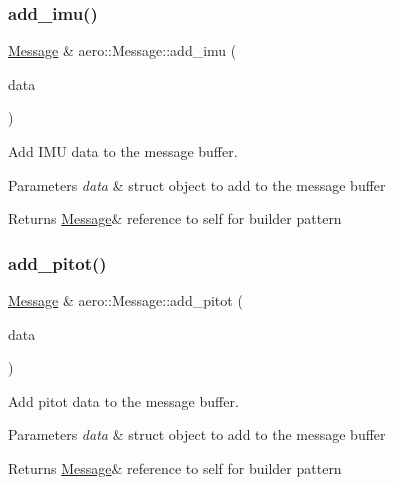 \subsubsection{\texorpdfstring{add\+\_\+imu()}{add\_imu()}}
{\footnotesize\ttfamily \hyperlink{classaero_1_1Message}{Message} \& aero\+::\+Message\+::add\+\_\+imu (\begin{DoxyParamCaption}\item[{const I\+MU \&}]{data }\end{DoxyParamCaption})}



Add I\+MU data to the message buffer. 


\begin{DoxyParams}{Parameters}
{\em data} & struct object to add to the message buffer \\
\hline
\end{DoxyParams}
\begin{DoxyReturn}{Returns}
\hyperlink{classaero_1_1Message}{Message}\& reference to self for builder pattern 
\end{DoxyReturn}
\mbox{\label{classaero_1_1Message_a7b6213ffe715f032ff1301ae8192a338}} 
\subsubsection{\texorpdfstring{add\+\_\+pitot()}{add\_pitot()}}
{\footnotesize\ttfamily \hyperlink{classaero_1_1Message}{Message} \& aero\+::\+Message\+::add\+\_\+pitot (\begin{DoxyParamCaption}\item[{const Pitot \&}]{data }\end{DoxyParamCaption})}



Add pitot data to the message buffer. 


\begin{DoxyParams}{Parameters}
{\em data} & struct object to add to the message buffer \\
\hline
\end{DoxyParams}
\begin{DoxyReturn}{Returns}
\hyperlink{classaero_1_1Message}{Message}\& reference to self for builder pattern 
\end{DoxyReturn}
\mbox{\label{classaero_1_1Message_ab113bd985f8470f2efcb02bf08d3227d}} 
